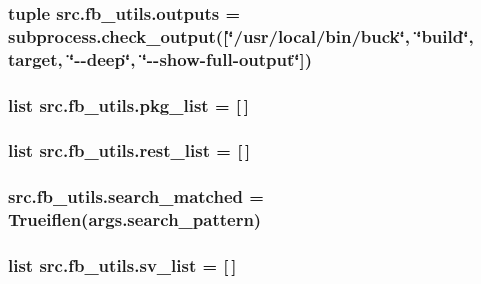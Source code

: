 \hypertarget{namespacesrc_1_1fb__utils_aa9f97d2b038d4ceb5ffc2e60bf863cf9}{
\subsubsection[{outputs}]{\setlength{\rightskip}{0pt plus 5cm}tuple src.\-fb\-\_\-utils.\-outputs = subprocess.\-check\-\_\-output(\mbox{[}\char`\"{}/usr/local/bin/buck\char`\"{}, \char`\"{}build\char`\"{}, target, \char`\"{}-\/-\/deep\char`\"{}, \char`\"{}-\/-\/show-\/full-\/output\char`\"{}\mbox{]})}}\label{namespacesrc_1_1fb__utils_aa9f97d2b038d4ceb5ffc2e60bf863cf9}
\hypertarget{namespacesrc_1_1fb__utils_aca9435d4a8098b550d3f06d94fe5d548}{
\subsubsection[{pkg\-\_\-list}]{\setlength{\rightskip}{0pt plus 5cm}list src.\-fb\-\_\-utils.\-pkg\-\_\-list = \mbox{[}$\,$\mbox{]}}}\label{namespacesrc_1_1fb__utils_aca9435d4a8098b550d3f06d94fe5d548}
\hypertarget{namespacesrc_1_1fb__utils_a48973a5f6d3b86bb52822b7c85f61444}{
\subsubsection[{rest\-\_\-list}]{\setlength{\rightskip}{0pt plus 5cm}list src.\-fb\-\_\-utils.\-rest\-\_\-list = \mbox{[}$\,$\mbox{]}}}\label{namespacesrc_1_1fb__utils_a48973a5f6d3b86bb52822b7c85f61444}
\hypertarget{namespacesrc_1_1fb__utils_aead8496e20f1296a9a85f942af37e40b}{
\subsubsection[{search\-\_\-matched}]{\setlength{\rightskip}{0pt plus 5cm}src.\-fb\-\_\-utils.\-search\-\_\-matched = Trueiflen(args.\-search\-\_\-pattern)}}\label{namespacesrc_1_1fb__utils_aead8496e20f1296a9a85f942af37e40b}
\hypertarget{namespacesrc_1_1fb__utils_ae8e6404645e507153d25d4fc42b3b024}{
\subsubsection[{sv\-\_\-list}]{\setlength{\rightskip}{0pt plus 5cm}list src.\-fb\-\_\-utils.\-sv\-\_\-list = \mbox{[}$\,$\mbox{]}}}\label{namespacesrc_1_1fb__utils_ae8e6404645e507153d25d4fc42b3b024}
